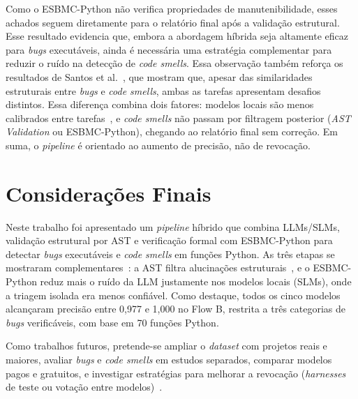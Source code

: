 \documentclass[sigconf]{acmart}
\begin{document}
Como o ESBMC-Python não verifica propriedades de manutenibilidade, esses achados seguem diretamente para o relatório final após a validação estrutural. Esse resultado evidencia que, embora a abordagem híbrida seja altamente eficaz para \textit{bugs} executáveis, ainda é necessária uma estratégia complementar para reduzir o ruído na detecção de \textit{code smells}. Essa observação também reforça os resultados de Santos et al.~\cite{santos2023yetanothermodel}, que mostram que, apesar das similaridades estruturais entre \textit{bugs} e \textit{code smells}, ambas as tarefas apresentam desafios distintos. Essa diferença combina dois fatores: modelos locais são menos calibrados entre tarefas~\cite{gheyi2025slms}, e \textit{code smells} não passam por filtragem posterior (\textit{AST Validation} ou ESBMC-Python), chegando ao relatório final sem correção. Em suma, o \textit{pipeline} é orientado ao aumento de precisão, não de revocação.



\section{Considerações Finais}

Neste trabalho foi apresentado um \textit{pipeline} híbrido que combina LLMs/SLMs, validação estrutural por AST e verificação formal com ESBMC-Python para detectar \textit{bugs} executáveis e \textit{code smells} em funções Python. As três etapas se mostraram complementares~\cite{tihanyi2025vulnerability}: a AST filtra alucinações estruturais~\cite{khati2026forge}, e o ESBMC-Python reduz mais o ruído da LLM justamente nos modelos locais (SLMs), onde a triagem isolada era menos confiável. Como destaque, todos os cinco modelos alcançaram precisão entre 0,977 e 1,000 no Flow B, restrita a três categorias de \textit{bugs} verificáveis, com base em 70 funções Python.



Como trabalhos futuros, pretende-se ampliar o \textit{dataset} com projetos reais e maiores, avaliar \textit{bugs} e \textit{code smells} em estudos separados, comparar modelos pagos e gratuitos, e investigar estratégias para melhorar a revocação (\textit{harnesses} de teste ou votação entre modelos)~\cite{shivaji2026eva,tihanyi2025vulnerability}.
\end{document}
